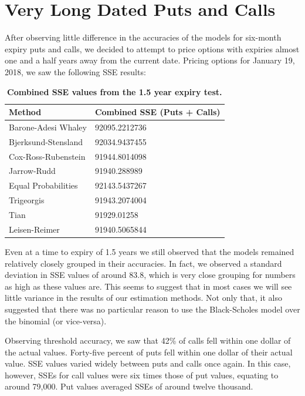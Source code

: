 \section{Very Long Dated Puts and Calls}

After observing little difference in the accuracies of the models for six-month expiry puts and calls, we decided to attempt to price options with expiries almost one and a half years away from the current date. Pricing options for January 19, 2018, we saw the following SSE results:

\begin{table}[h!]
\centering
\begin{tabu} to .8\textwidth { | X[c] | X[c] | }
 \hline
Method & Combined SSE (Puts + Calls)\\
 \hline
Barone-Adesi Whaley & 92095.2212736\\
Bjerksund-Stensland &  92034.9437455\\
Cox-Ross-Rubenstein & 91944.8014098\\
Jarrow-Rudd & 91940.288989 \\
 Equal Probabilities & 92143.5437267\\
Trigeorgis & 91943.2074004 \\
Tian & 91929.01258\\
Leisen-Reimer & 91940.5065844\\
\hline
\end{tabu}
\caption {\textbf{Combined SSE values from the 1.5 year expiry test.}}
\end{table}

Even at a time to expiry of 1.5 years we still observed that the models remained relatively closely grouped in their accuracies. In fact, we observed a standard deviation in SSE values of around 83.8, which is very close grouping for numbers as high as these values are. This seems to suggest that in most cases we will see little variance in the results of our estimation methods. Not only that, it also suggested that there was no particular reason to use the Black-Scholes model over the binomial (or vice-versa). 

Observing threshold accuracy, we saw that 42\% of calls fell within one dollar of the actual values. Forty-five percent of puts fell within one dollar of their actual value. SSE values varied widely between puts and calls once again. In this case, however, SSEs for call values were six times those of put values, equating to around 79,000. Put values averaged SSEs of around twelve thousand. 


